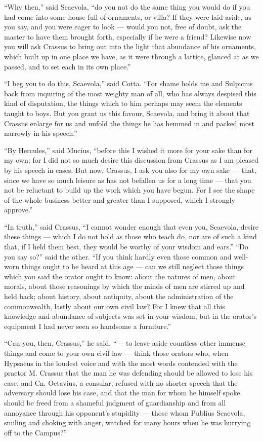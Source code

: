  ``Why then,'' said Scaevola, ``do you not do the same thing you would do if you had come into some house full of ornaments, or villa? If they were laid aside, as you say, and you were eager to look — would you not, free of doubt, ask the master to have them brought forth, especially if he were a friend? Likewise now you will ask Crassus to bring out into the light that abundance of his ornaments, which built up in one place we have, as it were through a lattice, glanced at as we passed, and to set each in its own place.''

 ``I beg you to do this, Scaevola,'' said Cotta. ``For shame holds me and Sulpicius back from inquiring of the most weighty man of all, who has always despised this kind of disputation, the things which to him perhaps may seem the elements taught to boys. But you grant us this favour, Scaevola, and bring it about that Crassus enlarge for us and unfold the things he has hemmed in and packed most narrowly in his speech.''

 ``By Hercules,'' said Mucius, ``before this I wished it more for your sake than for my own; for I did not so much desire this discussion from Crassus as I am pleased by his speech in cases. But now, Crassus, I ask you also for my own sake — that, since we have so much leisure as has not befallen us for a long time — that you not be reluctant to build up the work which you have begun. For I see the shape of the whole business better and greater than I supposed, which I strongly approve.''

 ``In truth,'' said Crassus, ``I cannot wonder enough that even you, Scaevola, desire these things — which I do not hold as those who teach do, nor are of such a kind that, if I held them best, they would be worthy of your wisdom and ears.'' ``Do you say so?'' said the other. ``If you think hardly even those common and well-worn things ought to be heard at this age — can we still neglect those things which you said the orator ought to know: about the natures of men, about morals, about those reasonings by which the minds of men are stirred up and held back; about history, about antiquity, about the administration of the commonwealth, lastly about our own civil law? For I knew that all this knowledge and abundance of subjects was set in your wisdom; but in the orator's equipment I had never seen so handsome a furniture.''

 ``Can you, then, Crassus,'' he said, ``— to leave aside countless other immense things and come to your own civil law — think those orators who, when Hypsaeus in the loudest voice and with the most words contended with the praetor M. Crassus that the man he was defending should be allowed to lose his case, and Cn. Octavius, a consular, refused with no shorter speech that the adversary should lose his case, and that the man for whom he himself spoke should be freed from a shameful judgment of guardianship and from all annoyance through his opponent's stupidity — those whom Publius Scaevola, smiling and choking with anger, watched for many hours when he was hurrying off to the Campus?''

